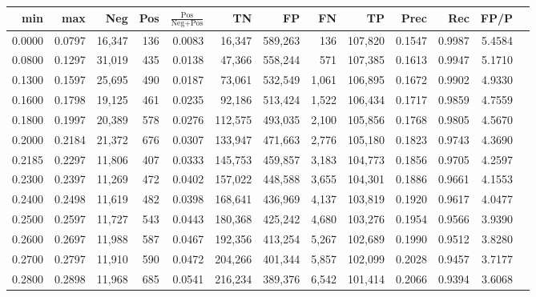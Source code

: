 \begin{tabular}{rrrrrrrrrrrrr}
\toprule
   min &    max &    Neg &   Pos & $\frac{\text{Pos}}{\text{Neg}+\text{Pos}}$ &      TN &      FP &      FN &      TP &   Prec &    Rec &   FP/P \\
\midrule
0.0000 & 0.0797 & 16,347 &   136 &                                     0.0083 &  16,347 & 589,263 &     136 & 107,820 & 0.1547 & 0.9987 & 5.4584 \\
0.0800 & 0.1297 & 31,019 &   435 &                                     0.0138 &  47,366 & 558,244 &     571 & 107,385 & 0.1613 & 0.9947 & 5.1710 \\
0.1300 & 0.1597 & 25,695 &   490 &                                     0.0187 &  73,061 & 532,549 &   1,061 & 106,895 & 0.1672 & 0.9902 & 4.9330 \\
0.1600 & 0.1798 & 19,125 &   461 &                                     0.0235 &  92,186 & 513,424 &   1,522 & 106,434 & 0.1717 & 0.9859 & 4.7559 \\
0.1800 & 0.1997 & 20,389 &   578 &                                     0.0276 & 112,575 & 493,035 &   2,100 & 105,856 & 0.1768 & 0.9805 & 4.5670 \\
0.2000 & 0.2184 & 21,372 &   676 &                                     0.0307 & 133,947 & 471,663 &   2,776 & 105,180 & 0.1823 & 0.9743 & 4.3690 \\
0.2185 & 0.2297 & 11,806 &   407 &                                     0.0333 & 145,753 & 459,857 &   3,183 & 104,773 & 0.1856 & 0.9705 & 4.2597 \\
0.2300 & 0.2397 & 11,269 &   472 &                                     0.0402 & 157,022 & 448,588 &   3,655 & 104,301 & 0.1886 & 0.9661 & 4.1553 \\
0.2400 & 0.2498 & 11,619 &   482 &                                     0.0398 & 168,641 & 436,969 &   4,137 & 103,819 & 0.1920 & 0.9617 & 4.0477 \\
0.2500 & 0.2597 & 11,727 &   543 &                                     0.0443 & 180,368 & 425,242 &   4,680 & 103,276 & 0.1954 & 0.9566 & 3.9390 \\
0.2600 & 0.2697 & 11,988 &   587 &                                     0.0467 & 192,356 & 413,254 &   5,267 & 102,689 & 0.1990 & 0.9512 & 3.8280 \\
0.2700 & 0.2797 & 11,910 &   590 &                                     0.0472 & 204,266 & 401,344 &   5,857 & 102,099 & 0.2028 & 0.9457 & 3.7177 \\
0.2800 & 0.2898 & 11,968 &   685 &                                     0.0541 & 216,234 & 389,376 &   6,542 & 101,414 & 0.2066 & 0.9394 & 3.6068 \\

\end{tabular}
